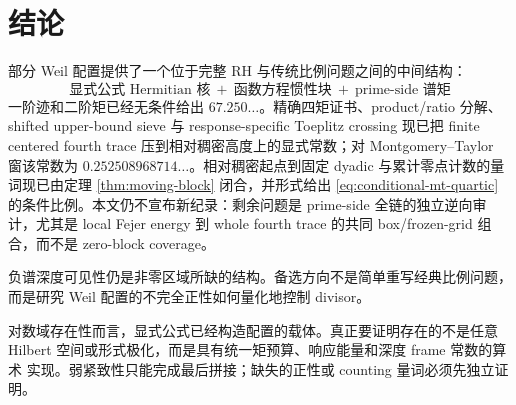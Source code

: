 \documentclass[UTF8,11pt,a4paper]{ctexart}
\theoremstyle{definition}
\theoremstyle{remark}
\begin{document}
\section{结论}

部分 Weil 配置提供了一个位于完整 RH 与传统比例问题之间的中间结构：
\[
\boxed{\text{显式公式 Hermitian 核}
\ +\ \text{函数方程惯性块}
\ +\ \text{prime-side 谱矩}}
\]
一阶迹和二阶矩已经无条件给出 $67.250\ldots$。精确四矩证书、product/ratio
分解、shifted upper-bound sieve 与 response-specific Toeplitz crossing
现已把 finite centered fourth trace 压到相对稠密高度上的显式常数；对
Montgomery--Taylor 窗该常数为 $0.252508968714\ldots$。相对稠密起点到固定
dyadic 与累计零点计数的量词现已由定理 \ref{thm:moving-block} 闭合，并形式给出
\eqref{eq:conditional-mt-quartic} 的条件比例。本文仍不宣布新纪录：剩余问题是
prime-side 全链的独立逆向审计，尤其是 local Fejer energy 到 whole fourth
trace 的共同 box/frozen-grid 组合，而不是 zero-block coverage。

负谱深度可见性仍是非零区域所缺的结构。备选方向不是简单重写经典比例问题，
而是研究 Weil 配置的不完全正性如何量化地控制 divisor。

对数域存在性而言，显式公式已经构造配置的载体。真正要证明存在的不是任意
Hilbert 空间或形式极化，而是具有统一矩预算、响应能量和深度 frame 常数的算术
实现。弱紧致性只能完成最后拼接；缺失的正性或 counting 量词必须先独立证明。
\end{document}
